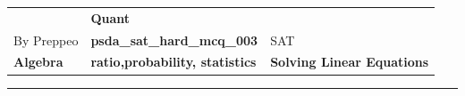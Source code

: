 \documentclass[11pt,paper=a4,answers]{exam}
\begin{document}
\begin{center}
    \centering
    \renewcommand{\arraystretch}{1.5}
    \begin{tabularx}{\textwidth}{YYY}
    & \normalsize\bf{{\Large{{Quant}}}} & \\
    By Preppeo & \normalsize\bf{{psda\_sat\_hard\_mcq\_003}} & SAT\\
    \normalsize{{\textbf{{Algebra}} }} & \normalsize{{\textbf{{ratio,probability, statistics }} }} & \normalsize{{\textbf{{Solving Linear Equations}} }} \\
    \end{tabularx}
\end{center}
\par\noindent\rule{\textwidth}{1pt}
\end{document}
